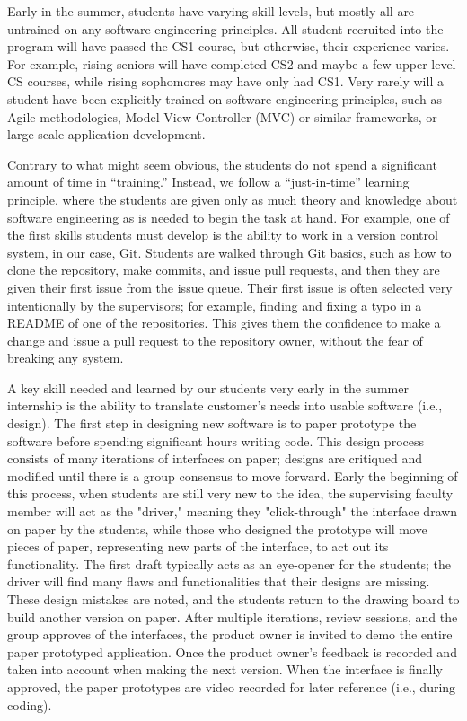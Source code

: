 Early in the summer, students have varying skill levels, but mostly all are untrained on any software engineering principles. All student recruited into the program will have passed the CS1 course, but otherwise, their experience varies. For example, rising seniors will have completed CS2 and maybe a few upper level CS courses, while rising sophomores may have only had CS1. Very rarely will a student have been explicitly trained on software engineering principles, such as Agile methodologies, Model-View-Controller (MVC) or similar frameworks, or large-scale application development.

Contrary to what might seem obvious, the students do not spend a significant amount of time in ``training.'' Instead, we follow a ``just-in-time'' learning principle, where the students are given only as much theory and knowledge about software engineering as is needed to begin the task at hand. For example, one of the first skills students must develop is the ability to work in a version control system, in our case, Git. Students are walked through Git basics, such as how to clone the repository, make commits, and issue pull requests, and then they are given their first issue from the issue queue. Their first issue is often selected very intentionally by the supervisors; for example, finding and fixing a typo in a README of one of the repositories. This gives them the confidence to make a change and issue a pull request to the repository owner, without the fear of breaking any system.

A key skill needed and learned by our students very early in the summer internship is the ability to translate customer's needs into usable software (i.e., design). The first step in designing new software is to paper prototype \cite{2003paperPrototype} the software before spending significant hours writing code. This design process consists of many iterations of interfaces on paper; designs are critiqued and modified until there is a group consensus to move forward. Early the beginning of this process, when students are still very new to the idea, the supervising faculty member will act as the "driver," meaning they "click-through" the interface drawn on paper by the students, while those who designed the prototype will move pieces of paper, representing new parts of the interface, to act out its functionality. The first draft typically acts as an eye-opener for the students; the driver will find many flaws and functionalities that their designs are missing. These design mistakes are noted, and the students return to the drawing board to build another version on paper. After multiple iterations, review sessions, and the group approves of the interfaces, the product owner is invited to demo the entire paper prototyped application. Once the product owner's feedback is recorded and taken into account when making the next version. When the interface is finally approved, the paper prototypes are video recorded for later reference (i.e., during coding).

